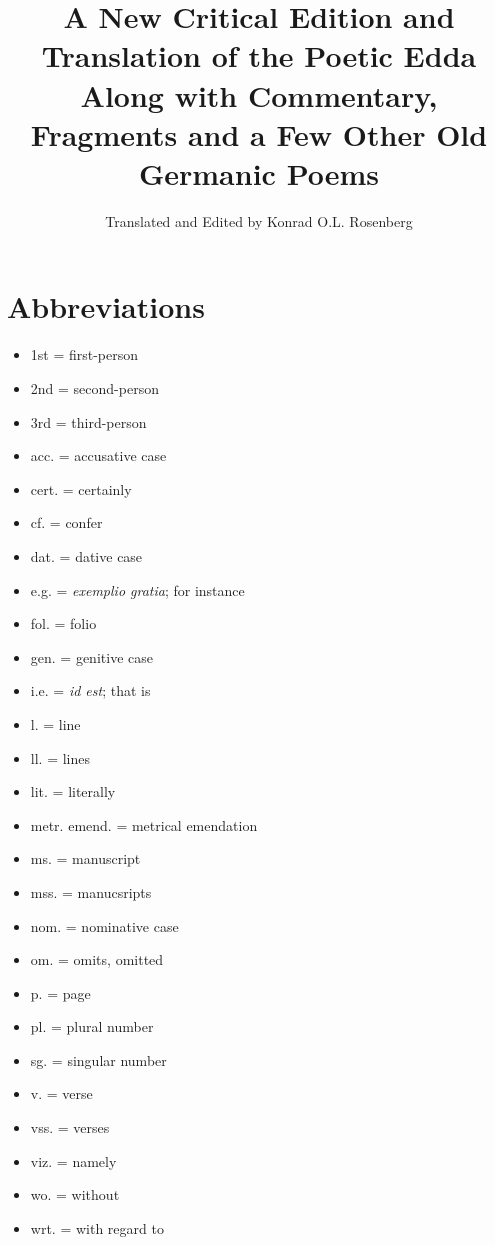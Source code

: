 \title{%
  A New Critical Edition and Translation of the Poetic Edda \\
  \large Along with Commentary, Fragments and a Few Other Old Germanic Poems}

\author{Translated and Edited by Konrad O.L. Rosenberg}

\maketitle

\newpage

\thispagestyle{empty}\tableofcontents

\newpage

\thispagestyle{empty}\section{Abbreviations}
  \begin{itemize}
    \item 1st = first-person
    \item 2nd = second-person
    \item 3rd = third-person
    \item acc. = accusative case
    \item cert. = certainly
    \item cf. = confer
    \item dat. = dative case
    \item e.g. = \emph{exemplio gratia}; for instance
    \item fol. = folio
    \item gen. = genitive case
    \item i.e. = \emph{id est}; that is
    \item l. = line
    \item ll. = lines
    \item lit. = literally
    \item metr. emend. = metrical emendation
    \item ms. = manuscript
    \item mss. = manucsripts
    \item nom. = nominative case
    \item om. = omits, omitted
    \item p. = page
    \item pl. = plural number
    \item sg. = singular number
    \item v. = verse
    \item vss. = verses
    \item viz. = namely
    \item wo. = without
    \item wrt. = with regard to
  \end{itemize}

